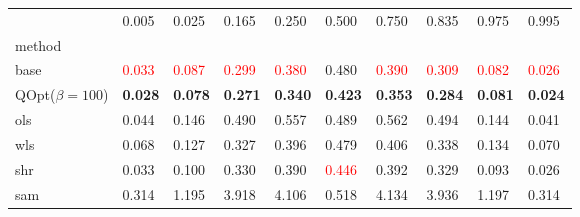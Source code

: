 \begin{tabular}{llllllllll}
\toprule
 & 0.005 & 0.025 & 0.165 & 0.250 & 0.500 & 0.750 & 0.835 & 0.975 & 0.995 \\
method &  &  &  &  &  &  &  &  &  \\
\midrule
base & \textcolor{red}{0.033} & \textcolor{red}{0.087} & \textcolor{red}{0.299} & \textcolor{red}{0.380} & 0.480 & \textcolor{red}{0.390} & \textcolor{red}{0.309} & \textcolor{red}{0.082} & \textcolor{red}{0.026} \\
\midrule
QOpt($\beta=100$) & \textbf{0.028} & \textbf{0.078} & \textbf{0.271} & \textbf{0.340} & \textbf{0.423} & \textbf{0.353} & \textbf{0.284} & \textbf{0.081} & \textbf{0.024} \\
ols & 0.044 & 0.146 & 0.490 & 0.557 & 0.489 & 0.562 & 0.494 & 0.144 & 0.041 \\
wls & 0.068 & 0.127 & 0.327 & 0.396 & 0.479 & 0.406 & 0.338 & 0.134 & 0.070 \\
shr & 0.033 & 0.100 & 0.330 & 0.390 & \textcolor{red}{0.446} & 0.392 & 0.329 & 0.093 & 0.026 \\
sam & 0.314 & 1.195 & 3.918 & 4.106 & 0.518 & 4.134 & 3.936 & 1.197 & 0.314 \\
\bottomrule
\end{tabular}